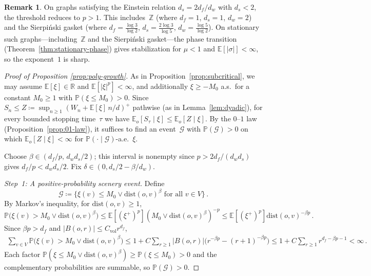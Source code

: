 \documentclass[11pt]{amsart}
\theoremstyle{plain}
\theoremstyle{definition}
\newtheorem{remark}[theorem]{Remark}
\newcommand{\Z}{\mathbb{Z}}
\newcommand{\R}{\mathbb{R}}
\newcommand{\E}{\mathbb{E}}
\renewcommand{\P}{\mathbb{P}}
\begin{document}
	\begin{remark}\label{rem:poly-growth-examples}
		On graphs satisfying the Einstein relation $d_s=2d_f/d_w$ with $d_s<2$, the threshold reduces to $p>1$. This includes~$\Z$ (where $d_f=1$, $d_s=1$, $d_w=2$) and the Sierpi\'nski gasket (where $d_f=\frac{\log 3}{\log 2}$, $d_s=\frac{2\log 3}{\log 5}$, $d_w=\frac{\log 5}{\log 2}$). On stationary such graphs---including~$\Z$ and the Sierpi\'nski gasket---the phase transition (Theorem~\ref{thm:stationary-phase}) gives stabilization for $\mu < 1$ and $\E[|\sigma|]<\infty$, so the exponent~$1$ is sharp.
	\end{remark}
	
	\begin{proof}[Proof of Proposition \ref{prop:poly-growth}]
		As in Proposition~\ref{prop:subcritical}, we may assume $\E[\xi]\in\R$ and $\E[|\xi|^p]<\infty$, and additionally $\xi\geq -M_0$ a.s.\ for a constant $M_0\geq 1$ with $\P(\xi\leq M_0)>0$. Since $S_n\leq Z\coloneqq\sup_{n\geq 1}(W_n+\E[\xi]\,n/d)^+$ pathwise (as in Lemma~\ref{lem:dyadic}), for every bounded stopping time~$\tau$ we have $\E_o[S_\tau\mid\xi]\leq\E_o[Z\mid\xi]$. By the $0$--$1$ law (Proposition~\ref{prop:01-law}), it suffices to find an event~$\mathcal{G}$ with $\P(\mathcal{G})>0$ on which $\E_o[Z\mid\xi]<\infty$ for $\P(\cdot\mid\mathcal{G})$-a.e.~$\xi$.
		
		Choose $\beta\in(d_f/p,\,d_w d_s/2)$; this interval is nonempty since $p>2d_f/(d_w d_s)$ gives $d_f/p<d_w d_s/2$. Fix $\delta\in(0, d_s/2-\beta/d_w)$.
		
		\emph{Step~1: A positive-probability scenery event.}
		Define
		\[
		\mathcal{G} \coloneqq \bigl\{\xi(v)\leq M_0 \vee \mathrm{dist}(o,v)^\beta \text{ for all } v\in V\bigr\}\,.
		\]
		By Markov's inequality, for $\mathrm{dist}(o,v)\geq 1$,
		\[
		\P\bigl(\xi(v)>M_0\vee \mathrm{dist}(o,v)^\beta\bigr)
		\leq \E[(\xi^+)^p](M_0\vee \mathrm{dist}(o,v)^\beta)^{-p}
		\leq \E[(\xi^+)^p] \mathrm{dist}(o,v)^{-\beta p}\,.
		\]
		Since $\beta p>d_f$ and $|B(o,r)|\leq C_{\mathrm{vol}} r^{d_f}$,
		\begin{align*}
			\sum_{v\in V}\P\bigl(\xi(v)>M_0\vee \mathrm{dist}(o,v)^\beta\bigr)
			\leq 1 + C\sum_{r\geq 1}|B(o,r)|\bigl(r^{-\beta p}-(r{+}1)^{-\beta p}\bigr) 
			\leq 1 + C\sum_{r\geq 1}r^{d_f-\beta p-1}
			< \infty\,.
		\end{align*}
		Each factor $\P(\xi\leq M_0\vee \mathrm{dist}(o,v)^\beta)\geq\P(\xi\leq M_0)>0$ and the complementary probabilities are summable, so $\P(\mathcal{G})>0$.
		

\end{proof}
\end{document}
